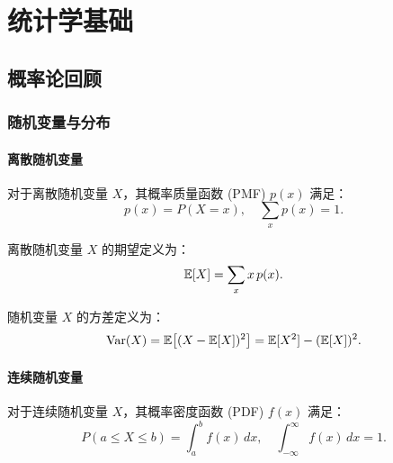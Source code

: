 \part{统计学基础}

\chapter{概率论回顾}

\section{随机变量与分布}

\subsection{离散随机变量}

\begin{definition}[概率质量函数]
对于离散随机变量 $X$，其概率质量函数 (PMF) $p(x)$ 满足：
\begin{equation}
    p(x) = P(X = x),\quad \sum_{x} p(x) = 1.
\end{equation}
\end{definition}

\begin{definition}[期望]
离散随机变量 $X$ 的期望定义为：
\begin{equation}
    \mathbb{E}[X] = \sum_{x} x\,p(x).
\end{equation}
\end{definition}

\begin{definition}[方差]
随机变量 $X$ 的方差定义为：
\begin{equation}
    \mathrm{Var}(X) = \mathbb{E}\big[(X - \mathbb{E}[X])^2\big] = \mathbb{E}[X^2] - (\mathbb{E}[X])^2.
\end{equation}
\end{definition}

\subsection{连续随机变量}

\begin{definition}[概率密度函数]
对于连续随机变量 $X$，其概率密度函数 (PDF) $f(x)$ 满足：
\begin{equation}
    P(a \le X \le b) = \int_{a}^{b} f(x)\,dx,\quad \int_{-\infty}^{\infty} f(x)\,dx = 1.
\end{equation}
\end{definition}

